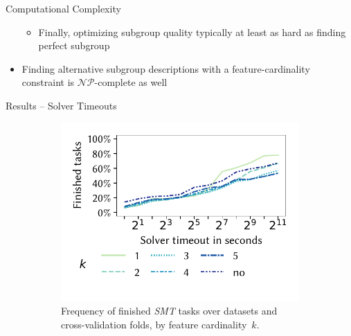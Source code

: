 \documentclass[en, navbaroff, handout]{sdqbeamer}
\begin{document}
\begin{frame}[t]{Computational Complexity}
\begin{itemize}
\begin{itemize}
			\item Finally, optimizing subgroup quality typically at least as hard as finding perfect subgroup
		\end{itemize}
		\vspace{\baselineskip}
		\item Finding alternative subgroup descriptions with a feature-cardinality constraint is $\mathcal{NP}$-complete as well
	\end{itemize}
\end{frame}

\begin{frame}[t]{Results -- Solver Timeouts}
	\begin{figure}
		\centering
		\begin{subfigure}[t]{0.32\textwidth}
			\centering
			\includegraphics[width=\textwidth, trim=10 25 10 10, clip]{plots/csd-timeouts-finished-tasks.pdf}
			\caption{
				Frequency of finished \emph{SMT} tasks over datasets and cross-validation folds, by feature cardinality~$k$.
			}
			\label{fig:csd:timeouts-finished-tasks}
		\end{subfigure}
		\hspace{1cm}
		\begin{subfigure}[t]{0.32\textwidth}

\end{subfigure}
\end{figure}
\end{frame}
\end{document}

